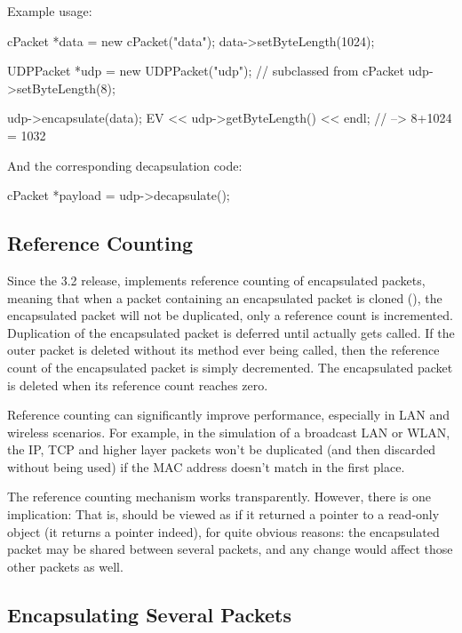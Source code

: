 Example usage:

\begin{cpp}
cPacket *data = new cPacket("data");
data->setByteLength(1024);

UDPPacket *udp = new UDPPacket("udp"); // subclassed from cPacket
udp->setByteLength(8);

udp->encapsulate(data);
EV << udp->getByteLength() << endl; // --> 8+1024 = 1032
\end{cpp}

And the corresponding decapsulation code:

\begin{cpp}
cPacket *payload = udp->decapsulate();
\end{cpp}



\subsection{Reference Counting}
\label{sec:messages:reference-counting}

Since the 3.2 release, {\opp} implements reference counting of encapsulated
packets, meaning that when a packet containing an encapsulated packet is
cloned (), the encapsulated packet will not be duplicated,
only a reference count is incremented. Duplication of
the encapsulated packet is deferred until 
actually gets called. If the outer packet is deleted without its
 method ever being called, then the reference
count of the encapsulated packet is simply decremented. The
encapsulated packet is deleted when its reference count reaches
zero.

Reference counting can significantly improve performance, especially
in LAN and wireless scenarios. For example, in the simulation of a
broadcast LAN or WLAN, the IP, TCP and higher layer packets won't
be duplicated (and then discarded without being used) if the
MAC address doesn't match in the first place.

The reference counting mechanism works transparently. However, there
is one implication:  That is,
 should be viewed as if it returned a
pointer to a read-only object (it returns a  pointer
indeed), for quite obvious reasons: the encapsulated packet may be
shared between several packets, and any change would affect those
other packets as well.


\subsection{Encapsulating Several Packets}
\label{sec:messages:encapsulating-several-packets}

